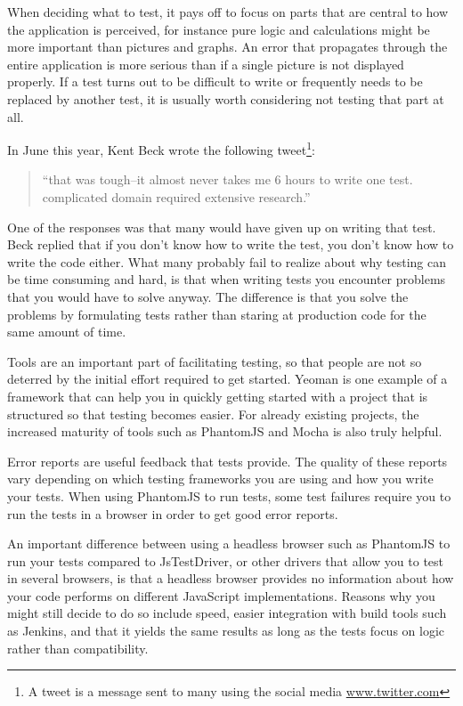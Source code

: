 \documentclass[11pt]{article}
\begin{document}
When deciding what to test, it pays off to focus on parts that are central to how the application is perceived, for instance pure logic and calculations might be more important than pictures and graphs. An error that propagates through the entire application is more serious than if a single picture is not displayed properly. If a test turns out to be difficult to write or frequently needs to be replaced by another test, it is usually worth considering not testing that part at all. \cite[questions~9-10]{Edelstam}

In June this year, Kent Beck wrote the following tweet\footnote{A tweet is a message sent to many using the social media \url{www.twitter.com}}:

\begin{quote}
``that was tough--it almost never takes me 6 hours to write one test. complicated domain required extensive research.''
\end{quote}

One of the responses was that many would have given up on writing that test. Beck replied that if you don't know how to write the test, you don't know how to write the code either\cite{TwitterKentBeck}. What many probably fail to realize about why testing can be time consuming and hard, is that when writing tests you encounter problems that you would have to solve anyway. The difference is that you solve the problems by formulating tests rather than staring at production code for the same amount of time. \cite[question~11]{Edelstam}

Tools are an important part of facilitating testing, so that people are not so deterred by the initial effort required to get started. Yeoman is one example of a framework that can help you in quickly getting started with a project that is structured so that testing becomes easier. For already existing projects, the increased maturity of tools such as PhantomJS and Mocha is also truly helpful. \cite[questions~11-12 and 20]{Edelstam}

Error reports are useful feedback that tests provide. The quality of these reports vary depending on which testing frameworks you are using and how you write your tests. When using PhantomJS to run tests, some test failures require you to run the tests in a browser in order to get good error reports. \cite[question~12]{Edelstam}

An important difference between using a headless browser such as PhantomJS to run your tests compared to JsTestDriver, or other drivers that allow you to test in several browsers, is that a headless browser provides no information about how your code performs on different JavaScript implementations. Reasons why you might still decide to do so include speed, easier integration with build tools such as Jenkins, and that it yields the same results as long as the tests focus on logic rather than compatibility. \cite[questions~13-15]{Edelstam}
\end{document}
